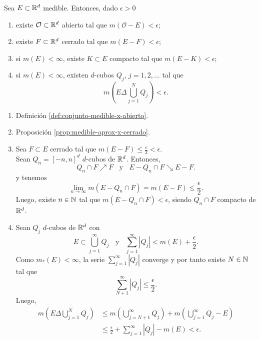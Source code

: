 \begin{teorema}{}
Sea $E\subset \mathbb{R}^d$ medible. Entonces, dado $\epsilon>0$ 
\begin{enumerate}
    \item existe $\mathcal{O}\subset \mathbb{R}^d$ abierto tal que $m(\mathcal{O}-E)<\epsilon$;
    \item existe $F\subset \mathbb{R}^d$ cerrado tal que $m(E-F)<\epsilon$;
    \item si $m(E)<\infty$, existe $K \subset E$ compacto tal que 
    $m(E-K)<\epsilon$;
    \item si $m(E)<\infty$, existen $d$-cubos $Q_j$, $j=1,2,\dots$ tal que 
    \[
    m\left(E\Delta \bigcup\limits_{j=1}^N Q_j\right)<\epsilon.
    \]
\end{enumerate}
\end{teorema}



\begin{demo}
\begin{enumerate}
    \item Definici\'on \ref{def:conjunto-medible-x-abierto}.
    \item Proposici\'on \ref{prop:medible-aprox-x-cerrado}.
    \item Sea $F\subset E$ cerrado tal que 
    $m(E-F)\leq \frac{\epsilon}{2}<\epsilon$. \\
    Sean $Q_n=[-n,n]^d$ $d$-cubos de $\mathbb{R}^d$. Entonces, 
    \[
    Q_n\cap F \nearrow F \;\; \mbox{ y }\;\; E-Q_n\cap F \searrow E-F.
    \]
 y tenemos
    \[
    \lim\limits_{n \to \infty}m\left(E-Q_n\cap F\right)=m(E-F)\leq \frac{\epsilon}{2}.
    \]
    Luego, existe $n\in \mathbb{N}$ tal que $m(E-Q_n\cap F)<\epsilon$, 
    siendo $Q_n\cap F$ compacto de $\mathbb{R}^d$.
    \item Sean $Q_j$ $d$-cubos de $\mathbb{R}^d$ con  
    \[
    E\subset \bigcup\limits_{j=1}^{\infty} Q_j\;\; \mbox{ y }\;\;
    \sum\limits_{j=1}^{\infty} |Q_j|<m(E)+\frac{\epsilon}{2}.
    \]
    Como $m_{*}(E)<\infty$, la serie $\sum\limits_{j=1}^{\infty} |Q_j|$
    converge y por tanto existe $N\in \mathbb{N}$ tal que 
    \[\sum\limits_{N+1}^{\infty} |Q_j|\leq \frac{\epsilon}{2}.\]
    Luego, 
    \[
    \begin{split}
    m\left(E\Delta \bigcup\limits_{j=1}^N Q_j\right)&\leq 
    m\left(\bigcup\limits_{j=N+1}^{\infty} Q_j\right)+m\left(\bigcup\limits_{j=1}^{\infty} Q_j-E\right)
    \\
    &\leq 
    \frac{\epsilon}{2}+\sum\limits_{j=1}^{\infty}|Q_j|-m(E)<
    \epsilon.
    \end{split}
    \]
    \end{enumerate}
\end{demo}

